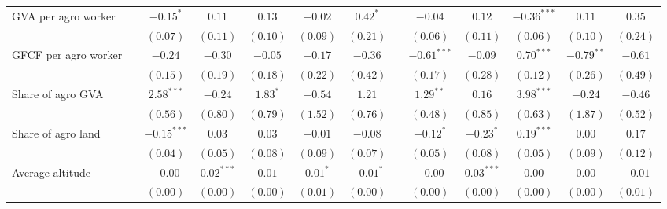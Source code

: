 \begin{table}
\begin{center}
\begin{tabular}{l c c c c c c c c c c c c}
GVA per agro worker               &               & $-0.15^{*}$   & $0.11$        & $0.13$         & $-0.02$        & $0.42^{*}$    &               & $-0.04$       & $0.12$        & $-0.36^{***}$  & $0.11$        & $0.35$        \\
                                  &               & $(0.07)$      & $(0.11)$      & $(0.10)$       & $(0.09)$       & $(0.21)$      &               & $(0.06)$      & $(0.11)$      & $(0.06)$       & $(0.10)$      & $(0.24)$      \\
GFCF per agro worker              &               & $-0.24$       & $-0.30$       & $-0.05$        & $-0.17$        & $-0.36$       &               & $-0.61^{***}$ & $-0.09$       & $0.70^{***}$   & $-0.79^{**}$  & $-0.61$       \\
                                  &               & $(0.15)$      & $(0.19)$      & $(0.18)$       & $(0.22)$       & $(0.42)$      &               & $(0.17)$      & $(0.28)$      & $(0.12)$       & $(0.26)$      & $(0.49)$      \\
Share of agro GVA                 &               & $2.58^{***}$  & $-0.24$       & $1.83^{*}$     & $-0.54$        & $1.21$        &               & $1.29^{**}$   & $0.16$        & $3.98^{***}$   & $-0.24$       & $-0.46$       \\
                                  &               & $(0.56)$      & $(0.80)$      & $(0.79)$       & $(1.52)$       & $(0.76)$      &               & $(0.48)$      & $(0.85)$      & $(0.63)$       & $(1.87)$      & $(0.52)$      \\
Share of agro land                &               & $-0.15^{***}$ & $0.03$        & $0.03$         & $-0.01$        & $-0.08$       &               & $-0.12^{*}$   & $-0.23^{*}$   & $0.19^{***}$   & $0.00$        & $0.17$        \\
                                  &               & $(0.04)$      & $(0.05)$      & $(0.08)$       & $(0.09)$       & $(0.07)$      &               & $(0.05)$      & $(0.08)$      & $(0.05)$       & $(0.09)$      & $(0.12)$      \\
Average altitude                  &               & $-0.00$       & $0.02^{***}$  & $0.01$         & $0.01^{*}$     & $-0.01^{*}$   &               & $-0.00$       & $0.03^{***}$  & $0.00$         & $0.00$        & $-0.01$       \\
                                  &               & $(0.00)$      & $(0.00)$      & $(0.00)$       & $(0.01)$       & $(0.00)$      &               & $(0.00)$      & $(0.00)$      & $(0.00)$       & $(0.00)$      & $(0.01)$      \\

\end{tabular}
\end{center}
\end{table}
